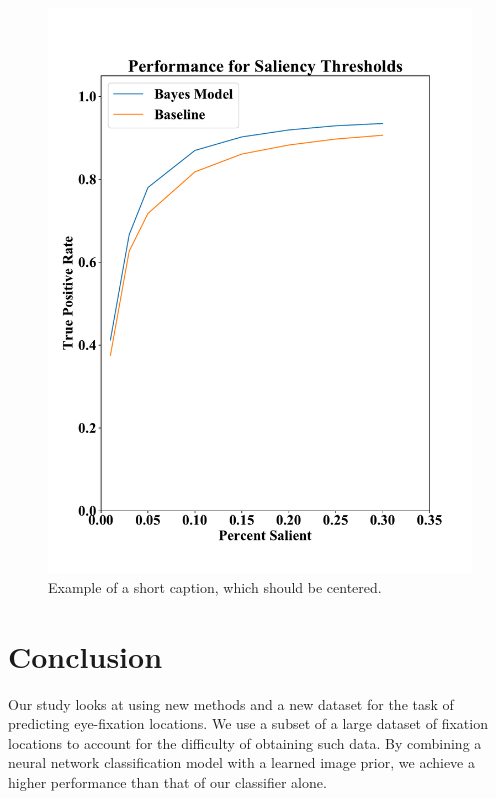\documentclass[10pt,twocolumn,letterpaper]{article}
\begin{document}
\begin{figure}
\begin{center}
\includegraphics[width=\columnwidth]{figures/tpr.pdf}

\end{center}
   \caption{Example of a short caption, which should be centered.}
\label{fig:tpr}
\end{figure}

\section{Conclusion} Our study looks at using new methods and a new dataset for
the task of predicting eye-fixation locations. We use a subset of a large
dataset of fixation locations to account for the difficulty of obtaining such
data.  By combining a neural network classification model with a learned image
prior, we achieve a higher performance than that of our classifier alone. 

{\small


}
\end{document}
